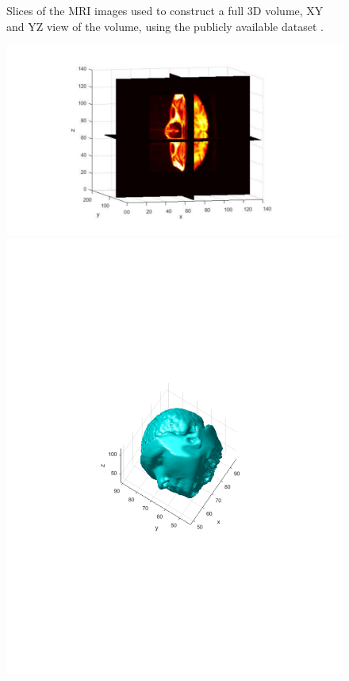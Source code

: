 \documentclass{UCF_ETD}
\begin{document}
\begin{figure}[H]
\begin{center}
\caption{Slices of the MRI images used to construct a full $3$D volume, XY and YZ view of the volume, using the publicly available dataset \cite{MRIDateSet}.}
\label{3DTransformationSlicesMRI.fig}
\end{center}
\end{figure}


\begin{figure}[H] 
\begin{center}
\includegraphics[scale=0.4]{RobustRegistration/3DVolumeInputSlices}
\includegraphics[scale=0.5]{RobustRegistration/3DVolumeSurface}

\end{center}
\end{figure}
\end{document}
